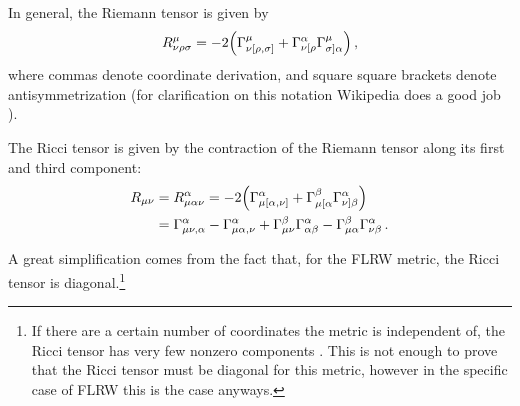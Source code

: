 \documentclass[main.tex]{subfiles}
\begin{document}
In general, the Riemann tensor is given by 
%
\begin{align}
R^{\mu }_{\nu \rho \sigma } = -2 \qty(\Gamma^{\mu }_{\nu [\rho , \sigma ]} + \Gamma^{\alpha }_{\nu [\rho } \Gamma^{\mu }_{\sigma ] \alpha })
\,,
\end{align}
%
where commas denote coordinate derivation, and square square brackets denote antisymmetrization (for clarification on this notation Wikipedia does a good job \cite{AntisymmetricTensor2019}). 

The Ricci tensor is given by the contraction of the Riemann tensor along its first and third component:
%
\begin{subequations}
\begin{align}
R_{\mu \nu } 
&= R^{\alpha }_{\mu \alpha \nu }
= -2 \qty(\Gamma^{\alpha }_{\mu [\alpha , \nu ]} + \Gamma^{\beta }_{\mu [\alpha } \Gamma^{\alpha }_{\nu ] \beta  })  \\
&= \Gamma^{\alpha }_{\mu \nu , \alpha } 
- \Gamma^{\alpha }_{\mu \alpha , \nu }
+ \Gamma^{\beta }_{\mu \nu } \Gamma^{\alpha }_{\alpha \beta } 
- \Gamma^{\beta}_{\mu \alpha } \Gamma^{\alpha }_{\nu \beta }
\,.
\end{align}
\end{subequations}

A great simplification comes from the fact that, for the FLRW metric, the Ricci tensor is diagonal.\footnote{If there are a certain number of coordinates the metric is independent of, the Ricci tensor has very few nonzero components \cite{winRicciTensorDiagonal1996}. This is not enough to prove that the Ricci tensor must be diagonal for this metric, however in the specific case of FLRW this is the case anyways.}
\end{document}
